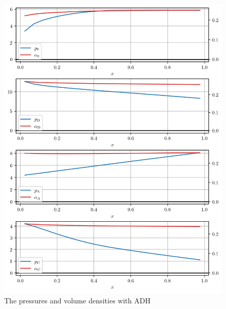 \documentclass{article}
\begin{document}
\begin{figure}
    \centering
    \includegraphics[width=.9\textwidth]{../results/4-7-2023/ADH_p_alpha.png}
    \caption{The pressures and volume densities with ADH}
\end{figure}
\end{document}

